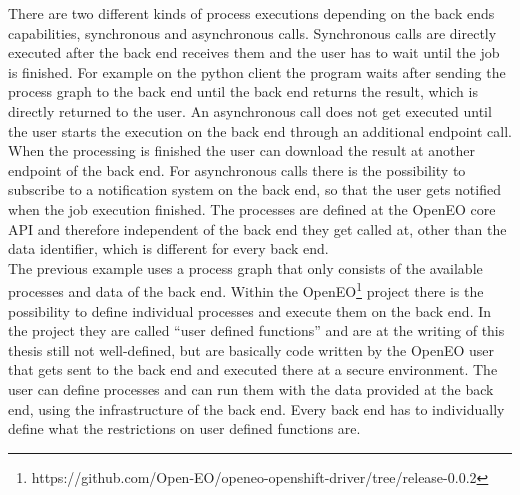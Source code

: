 \documentclass[draft,final]{vutinfth} %
\begin{document}
There are two different kinds of process executions depending on the back ends capabilities, synchronous and asynchronous calls. Synchronous calls are directly executed after the back end receives them and the user has to wait until the job is finished. For example on the python client the program waits after sending the process graph to the back end until the back end returns the result, which is directly returned to the user. An asynchronous call does not get executed until the user starts the execution on the back end through an additional endpoint call. When the processing is finished the user can download the result at another endpoint of the back end. For asynchronous calls there is the possibility to subscribe to a notification system on the back end, so that the user gets notified when the job execution finished.     
The processes are defined at the OpenEO core API and therefore independent of the back end they get called at, other than the data identifier, which is different for every back end.  
\\
The previous example uses a process graph that only consists of the available processes and data of the back end. Within the OpenEO\footnote{https://github.com/Open-EO/openeo-openshift-driver/tree/release-0.0.2} project there is the possibility to define individual processes and execute them on the back end. In the project they are called “user defined functions” and are at the writing of this thesis still not well-defined, but are basically code written by the OpenEO user that gets sent to the back end and executed there at a secure environment. The user can define processes and can run them with the data provided at the back end, using the infrastructure of the back end. Every back end has to individually define what the restrictions on user defined functions are. 
\end{document}
